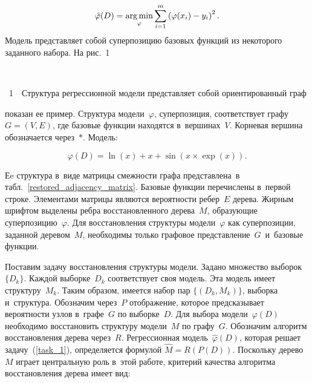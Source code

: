 \begin{multicols}{2}
\noindent
\begin{equation}
\hat{\varphi}(D)=\mathop{\mathop{\mathrm{arg}\,\mathrm{min}}}\limits_\varphi\sum\limits_{i=1}^m\left(\varphi(x_i)-
y_i\right)^2.
\label{task_1}
\end{equation}
Модель представляет собой суперпозицию базовых функций из некоторого заданного 
набора. На рис.~1\linebreak\vspace*{-12pt}

{ \begin{center}  %
 \vspace*{-3pt}
    \mbox{%
\epsfxsize=37.447mm
}

\end{center}

\vspace*{-2pt}

\noindent
{{\figurename~1}\ \ \small{Структура регрессионной модели представляет собой ориентированный 
граф
}}}

\vspace*{6pt}

\addtocounter{figure}{1}


\noindent
 показан ее пример. Структура модели~$\varphi$, 
суперпозиция, соответствует графу~$G=(V,E)$, где базовые функции находятся 
в~вершинах~$V$. {Корневая} вершина обозначается через~$\ast$. Модель:

\vspace*{1pt}

\noindent
$$
\varphi(D) =  \ln(x) + x + \sin\left( x\times \exp(x)\right).
$$

\vspace*{-4pt}

\noindent
 Еe структура в~виде матрицы 
смежности графа пред\-став\-ле\-на~в табл.~\ref{restored_adjacency_matrix}.
Базовые функции перечислены в~первой строке. Элементами матрицы являются 
вероятности ребер~$E$ дерева. Жир\-ным шриф\-том выделены ребра восстановленного 
дерева~$M$, образующие суперпозицию~$\varphi$. Для восстановления структуры 
модели~$\varphi$ как суперпозиции, заданной деревом~$M$, необходимы только 
графовое пред\-став\-ле\-ние~$G$~и~базовые функции.



Поставим задачу восстановления структуры модели. Задано множество 
выборок~$\{D_k\}$. Каждой выборке~$D_k$ соответствует своя модель. Эта модель 
имеет структуру~$M_k$. Таким образом, имеется набор пар $\{(D_k, M_k)\}$, 
выборка и~структура.
Обозначим через~$P$ отображение, которое предсказывает вероятности узлов 
в~графе~$G$ по выборке~$D$. Для выбора модели~$\varphi(D)$ необходимо восстановить 
структуру модели~$M$ по графу~$G$. Обозначим алгоритм восстановления дерева 
через~$R$. Регрессионная модель~$\hat{\varphi}(D)$, которая решает 
задачу~(\ref{task_1}), определяется формулой
$
\hat{M}=R\left(P(D)\right).
$
Поскольку дерево~$M$ играет центральную роль в~этой работе, критерий качества 
алгоритма восстановления дерева имеет вид:



\end{multicols}
